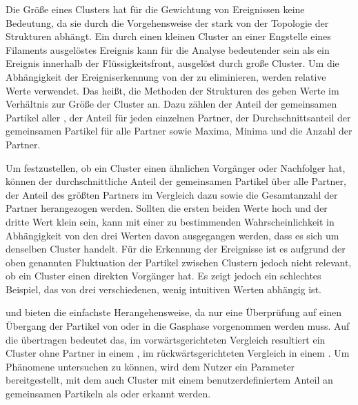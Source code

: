 Die Größe eines Clusters hat für die Gewichtung von Ereignissen keine Bedeutung, da sie durch die Vorgehensweise der \CFD stark von der Topologie der Strukturen abhängt. Ein durch einen kleinen Cluster an einer Engstelle eines Filaments ausgelöstes Ereignis kann für die Analyse bedeutender sein als ein Ereignis innerhalb der Flüssigkeitsfront, ausgelöst durch große Cluster. Um die Abhängigkeit der Ereigniserkennung von der  zu eliminieren, werden relative Werte verwendet. Das heißt, die Methoden der Strukturen des \SECC geben Werte im Verhältnis zur Größe der Cluster an. Dazu zählen der Anteil der gemeinsamen Partikel aller , der Anteil für jeden einzelnen Partner, der Durchschnittsanteil der gemeinsamen Partikel für alle Partner sowie Maxima, Minima und die Anzahl der Partner.

Um festzustellen, ob ein Cluster einen ähnlichen Vorgänger oder Nachfolger hat, können der durchschnittliche Anteil der gemeinsamen Partikel über alle Partner, der Anteil des größten Partners im Vergleich dazu sowie die Gesamtanzahl der Partner herangezogen werden. Sollten die ersten beiden Werte hoch und der dritte Wert klein sein, kann mit einer zu bestimmenden Wahrscheinlichkeit in Abhängigkeit von den drei Werten davon ausgegangen werden, dass es sich um denselben Cluster handelt. Für die Erkennung der Ereignisse ist es aufgrund der oben genannten Fluktuation der Partikel zwischen Clustern jedoch nicht relevant, ob ein Cluster einen direkten Vorgänger hat. Es zeigt jedoch ein schlechtes Beispiel, das von drei verschiedenen, wenig intuitiven Werten abhängig ist.

 und  bieten die einfachste Herangehensweise, da nur eine Überprüfung auf einen Übergang der Partikel von oder in die Gasphase vorgenommen werden muss. Auf die  übertragen bedeutet das, im vorwärtsgerichteten Vergleich resultiert ein Cluster ohne Partner in einem , im rückwärtsgerichteten Vergleich in einem . Um Phänomene untersuchen zu können, wird dem Nutzer ein Parameter bereitgestellt, mit dem auch Cluster mit einem benutzerdefiniertem Anteil an gemeinsamen Partikeln als  oder  erkannt werden.

